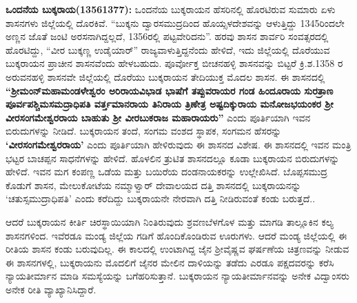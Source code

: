 \textbf{ ಒಂದನೆಯ ಬುಕ್ಕರಾಯ(1356\general{\enginline{-}}1377):} ಒಂದನೆಯ ಬುಕ್ಕರಾಯನ ಹೆಸರಿನಲ್ಲಿ ಹೊರಟಿರುವ ಸುಮಾರು ಏಳು ಶಾಸನಗಳು ಜಿಲ್ಲೆಯಲ್ಲಿ ದೊರಕಿವೆ. “ಬುಕ್ಕನು ದ್ವಾರಸಮುದ್ರದಿಂದ ಹೊಯ್ಸಳದೇಶವನ್ನು ಆಳುತ್ತಿದ್ದು 1345ರಿಂದಲೇ ಅಣ್ಣನ ಜೊತೆ ಜಂಟಿ ಅರಸನಾಗಿದ್ದಲ್ಲದೆ, 1356ರಲ್ಲಿ ಪಟ್ಟವೇರಿದನು”. ಹರವು ಶಾಸನ ಶಾರ್ವರಿ ಸಂವತ್ಸರದಲ್ಲಿ ಹೊರಟಿದ್ದು, “ವೀರ ಬುಕ್ಕಣ್ಣ ಉಡೈಯಾರ್​” ರಾಜ್ಯವಾಳುತ್ತಿದ್ದನೆಂದು ಹೇಳಿದೆ, ಇದು ಜಿಲ್ಲೆಯಲ್ಲಿ ದೊರೆಯುವ ಬುಕ್ಕರಾಯನ ಪ್ರಾಚೀನ ಶಾಸನವೆಂದು ಹೇಳಬಹುದು. ಪೂರ್ವೋಕ್ತ ಬೀಚನಹಳ್ಳಿ ಶಾಸನವನ್ನು ಬಿಟ್ಟರೆ ಕ್ರಿ.ಶ.1358 ರ ಅರುವನಹಳ್ಳಿ ಶಾಸನವೇ ಜಿಲ್ಲೆಯಲ್ಲಿ ದೊರೆಯು ಬುಕ್ಕರಾಯನ ತೇದಿಯುಕ್ತ ಮೊದಲ ಶಾಸನ. ಈ ಶಾಸನದಲ್ಲಿ \textbf{“ಶ‍್ರೀಮಂನ್​ ಮಹಾಮಂಡಳೇಶ್ವರಂ ಅರಿರಾಯವಿಭಾಡ ಭಾಷೆಗೆ ತಪ್ಪುವರಾಯರ ಗಂಡ ಹಿಂದೂರಾಯ ಸುರತ್ರಾಣ ಪೂರ್ವಪಶ್ಚಿಮಸಮದ್ರಾಧಿಪತಿ\general{\break } ವರ್ತ್ತಮಾನರಾಯ ತಿನಿರಾಯ ತ್ರಿಣೇತ್ರ ಅಷ್ಟದಿಕ್ಕುರಾಯ ಮನೋಜಭಯಂಕರ ಶ‍್ರೀ ವೀರಸಂಗಮೇಶ್ವರರಾಯ ಬಾಹುತು ಶ‍್ರೀ ವೀರಬುಕರಾಜ ಮಹಾರಾಯರು”} ಎಂದು ಪೂರ್ತಿಯಾಗಿ ಇವನ ಬಿರುದುಗಳನ್ನು ನೀಡಿದೆ. ಬುಕ್ಕರಾಯನ ತಂದೆ, ಸಂಗಮ ವಂಶದ ಸ್ಥಾಪಕ, ಸಂಗಮನ ಹೆಸರನ್ನು \textbf{‘ವೀರಸಂಗಮೇಶ್ವರರಾಯ’} ಎಂದು ಪೂರ್ತಿಯಾಗಿ ಹೇಳಿರುವುದು ಈ ಶಾಸನದ ವಿಶೇಷ. ಈ ಶಾಸನದಲ್ಲಿ ಇವನ ಮಂತ್ರಿ ಭಟ್ಟರ ಬಾಚಪ್ಪನ ಸಾಧನೆಗಳನ್ನು ಹೇಳಿದೆ. ಹೊಳಲಿನ ತ್ರುಟಿತ ಶಾಸನದಲ್ಲೂ ಕೂಡಾ ಬುಕ್ಕರಾಯನ ಬಿರುದುಗಳನ್ನು ಹೇಳಿದೆ. ಇವನ ಮಗ ಕಂಪಣ್ಣ ಒಡೆಯ ಮತ್ತು ಬಯಿರೆಯ ದಂಡನಾಯಕರನ್ನು ಉಲ್ಲೇಖಿಸಿದೆ. ಬೊಪ್ಪಸಮುದ್ರ ಕೊಡುಗೆ ಶಾಸನ, ಮೇಲುಕೋಟೆಯ ನಮ್ಮಾಳ್ವಾರ್​ ದೇವಾಲಯದ ದತ್ತಿ ಶಾಸನದಲ್ಲಿ ಬುಕ್ಕರಾಯನನ್ನು `ಚತುಸ್ಸಮುದ್ರಾಧಿಪತಿ' ಎಂದು ಕರೆದಿದ್ದು ಬುಕ್ಕರಾಯನೇ ನೇರವಾಗಿ ದತ್ತಿ ನೀಡಿರುವಂತೆ ಕಂಡು ಬರುತ್ತದೆ..

ಆದರೆ ಬುಕ್ಕರಾಯನ ಕೀರ್ತಿ ಚಿರಸ್ಥಾಯಿಯಾಗಿ ನಿಂತಿರುವುದು ಶ್ರವಣಬೆಳಗೊಳ ಮತ್ತು ಮಾಗಡಿ ತಾಲ್ಲೂಕಿನ ಕಲ್ಯ ಶಾಸನಗಳಿಂದ. ಇವೆರಡೂ ಮಂಡ್ಯ ಜಿಲ್ಲೆಯ ಗಡಿಗೆ ಹೊಂದಿಕೊಂಡಿರುವ ಊರುಗಳು. ಆದರೆ ಮಂಡ್ಯ ಜಿಲ್ಲೆಯಲ್ಲಿ ಈ ರೀತಿಯ ಶಾಸನ ಕಂಡು ಬರುವುದಿಲ್ಲ. ಈ ಕಾಲದಲ್ಲಿ ಉಂಟಾಗಿದ್ದ ಜೈನ ಶ‍್ರೀವೈಷ್ಣವ ಘರ್ಷಣೆಯ ಚಿತ್ರಣವನ್ನು ನೀಡುವ ಈ ಶಾಸನಗಳಲ್ಲಿ, ಬುಕ್ಕರಾಯನು ಮೊದಲಿಗೆ ಜೈನರ ಮೇಲಿನ ದಾಳಿಯನ್ನು ತಡೆದು ಎರಡೂ ಪಕ್ಷದವರನ್ನು ಕರೆಸಿ ನ್ಯಾಯತೀರ್ಮಾನ ಮಾಡಿ ಸಮಸ್ಯೆಯನ್ನು ಬಗೆಹರಿಸುತ್ತಾನೆ. ಬುಕ್ಕರಾಯನ ನ್ಯಾಯತೀರ್ಮಾನವನ್ನು ಅನೇಕ ವಿದ್ವಾಂಸರು ಅನೇಕ ರೀತಿ ವ್ಯಾಖ್ಯಾನಿಸಿದ್ದಾರೆ.

